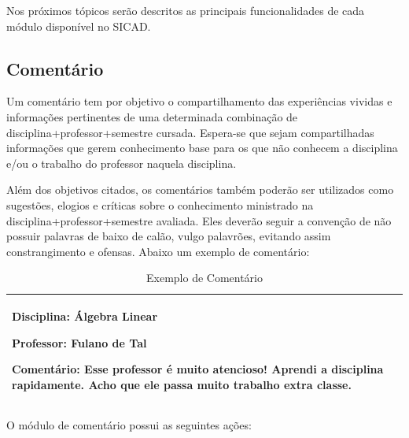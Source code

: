 \documentclass[12pt, a4paper]{report}
\begin{document}
Nos próximos tópicos serão descritos as principais funcionalidades de cada módulo disponível no \ac{SICAD}.

\subsection{Comentário}
\label{subsec:comentario}
Um comentário tem por objetivo o compartilhamento das experiências vividas e informações pertinentes de uma determinada combinação de disciplina+professor+semestre cursada. Espera-se que sejam compartilhadas informações que gerem conhecimento base para os que não conhecem a disciplina e/ou o trabalho do professor naquela disciplina.

Além dos objetivos citados, os comentários também poderão ser utilizados como sugestões, elogios e críticas sobre o conhecimento ministrado na disciplina+professor+semestre avaliada. Eles deverão seguir a convenção de não possuir palavras de baixo de calão, vulgo palavrões, evitando assim constrangimento e ofensas. Abaixo um exemplo de comentário:

\begin{table}[h]
 \centering
 {\renewcommand\arraystretch{1.25}
 \begin{tabular}{ l l }
  \cline{1-1}\cline{2-2}  
    \multicolumn{1}{|p{7.850cm}|}{\par \textbf{Disciplina:} Álgebra Linear
    \par \textbf{Professor:} Fulano de Tal
    \par \textbf{Comentário:} Esse professor é muito atencioso! Aprendi a disciplina rapidamente. Acho que ele passa muito trabalho extra classe.}
  \\  
  \hline
 \end{tabular}}
 \caption{Exemplo de Comentário}
\end{table}

O módulo de comentário possui as seguintes ações:
\end{document}
